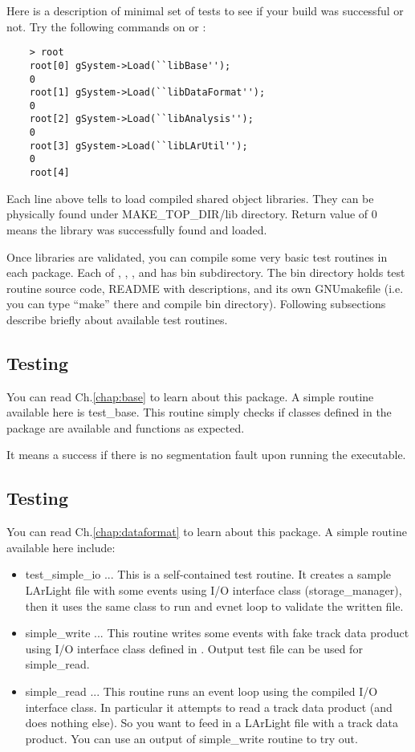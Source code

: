 
Here is a description of minimal set of tests to see if your build was successful or not. Try the following commands on \CINT or \PyROOT:
\begin{lstlisting}
    > root
    root[0] gSystem->Load(``libBase'');
    0
    root[1] gSystem->Load(``libDataFormat'');
    0
    root[2] gSystem->Load(``libAnalysis'');
    0
    root[3] gSystem->Load(``libLArUtil'');
    0
    root[4] 
\end{lstlisting}
Each line above tells \CINT to load compiled shared object libraries. They can be physically found under {\ttfamily MAKE\_TOP\_DIR/lib} directory. Return value of 0 means the library was successfully found and loaded.

Once libraries are validated, you can compile some very basic test routines in each package.
Each of \Base, \DataFormat, \Analysis, and \LArUtil has {\ttfamily bin} subdirectory. 
The {\ttfamily bin} directory holds test routine source code, README with descriptions, and 
its own GNUmakefile (i.e. you can type ``make'' there and compile {\ttfamily bin} directory). 
Following subsections describe briefly about available test routines.

\subsection{Testing \Base}
You can read Ch.\ref{chap:base} to learn about this package.
A simple routine available here is {\ttfamily test\_base}. This routine simply checks if \CPP
classes defined  in the package are available and functions as expected. 

It means a success if there is no segmentation fault upon running the executable.

\subsection{Testing \DataFormat}
You can read Ch.\ref{chap:dataformat} to learn about this package.
A simple routine available here include:
\begin{itemize}
\item {\ttfamily test\_simple\_io} ... This is a self-contained test routine. It creates a sample LArLight
\ROOT file with some events using I/O interface class ({\ttfamily storage\_manager}), then
it uses the same class to run and evnet loop to validate the written file. 
\item {\ttfamily simple\_write} ... This routine writes some events with fake track data product using 
I/O interface class defined in \DataFormat. Output test file can be used for {\ttfamily simple\_read}.
\item {\ttfamily simple\_read} ... This routine runs an event loop using the compiled I/O interface class.
In particular it attempts to read a track data product (and does nothing else). So you want to feed in
a LArLight \ROOT file with a track data product. You can use an output of {\ttfamily simple\_write} routine
to try out.                                       
\end{itemize}

